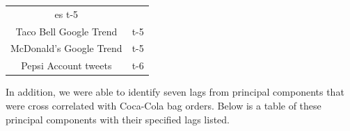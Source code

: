 \documentclass[12pt,oneside]{chicagocapstone}
\begin{document}
\begin{longtable}[]{@{}cc@{}}
\begin{minipage}[t]{0.43\columnwidth}
es t-5\strut
\end{minipage}\tabularnewline
\begin{minipage}[t]{0.34\columnwidth}\centering\strut
Taco Bell Google Trend\strut
\end{minipage} & \begin{minipage}[t]{0.43\columnwidth}\centering\strut
t-5\strut
\end{minipage}\tabularnewline
\begin{minipage}[t]{0.34\columnwidth}\centering\strut
McDonald's Google Trend\strut
\end{minipage} & \begin{minipage}[t]{0.43\columnwidth}\centering\strut
t-5\strut
\end{minipage}\tabularnewline
\begin{minipage}[t]{0.34\columnwidth}\centering\strut
Pepsi Account tweets\strut
\end{minipage} & \begin{minipage}[t]{0.43\columnwidth}\centering\strut
t-6\strut
\end{minipage}\tabularnewline
\bottomrule
\end{longtable}
In addition, we were able to identify seven lags from principal
components that were cross correlated with Coca-Cola bag orders. Below
is a table of these principal components with their specified lags
listed.
\end{document}
